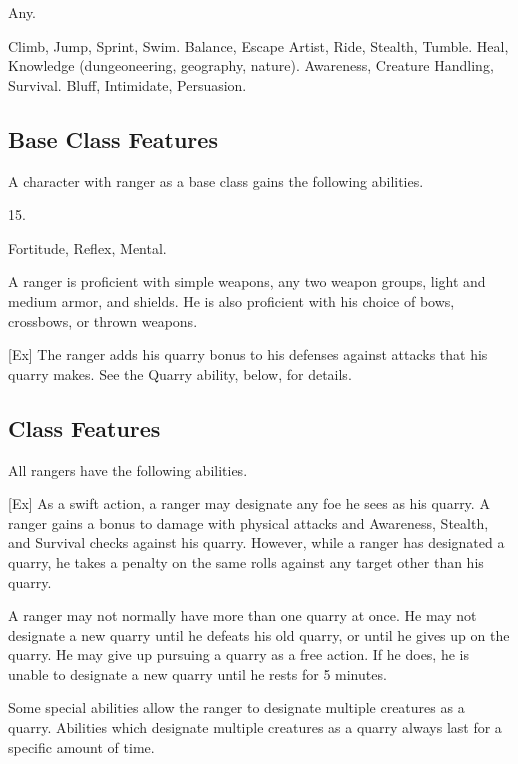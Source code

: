  Any.

 Climb, Jump, Sprint, Swim.
 Balance, Escape Artist, Ride, Stealth, Tumble.
 Heal, Knowledge (dungeoneering, geography, nature).
 Awareness, Creature Handling, Survival.
 Bluff, Intimidate, Persuasion.

\subsection{Base Class Features}
A character with ranger as a base class gains the following abilities.

 15.

  Fortitude,  Reflex,  Mental.

 A ranger is proficient with simple weapons, any two weapon groups, light and medium armor, and shields.
He is also proficient with his choice of bows, crossbows, or thrown weapons.

[Ex]
The ranger adds his quarry bonus to his defenses against attacks that his quarry makes.
See the Quarry ability, below, for details.

\subsection{Class Features}
All rangers have the following abilities.

[Ex]
As a swift action, a ranger may designate any foe he sees as his quarry.
A ranger gains a  bonus to damage with physical attacks and Awareness, Stealth, and Survival checks against his quarry.
However, while a ranger has designated a quarry, he takes a  penalty on the same rolls against any target other than his quarry.

A ranger may not normally have more than one quarry at once.
He may not designate a new quarry until he defeats his old quarry, or until he gives up on the quarry.
He may give up pursuing a quarry as a free action.
If he does, he is unable to designate a new quarry until he rests for 5 minutes.

Some special abilities allow the ranger to designate multiple creatures as a quarry.
Abilities which designate multiple creatures as a quarry always last for a specific amount of time.

